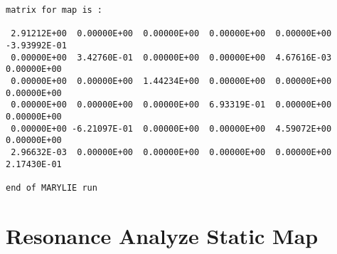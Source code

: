 \begin{footnotesize}
\begin{verbatim}
matrix for map is :

 2.91212E+00  0.00000E+00  0.00000E+00  0.00000E+00  0.00000E+00 -3.93992E-01
 0.00000E+00  3.42760E-01  0.00000E+00  0.00000E+00  4.67616E-03  0.00000E+00
 0.00000E+00  0.00000E+00  1.44234E+00  0.00000E+00  0.00000E+00  0.00000E+00
 0.00000E+00  0.00000E+00  0.00000E+00  6.93319E-01  0.00000E+00  0.00000E+00
 0.00000E+00 -6.21097E-01  0.00000E+00  0.00000E+00  4.59072E+00  0.00000E+00
 2.96632E-03  0.00000E+00  0.00000E+00  0.00000E+00  0.00000E+00  2.17430E-01

end of MARYLIE run

\end{verbatim}
\end{footnotesize}

\newpage
\section{Resonance Analyze Static Map}
